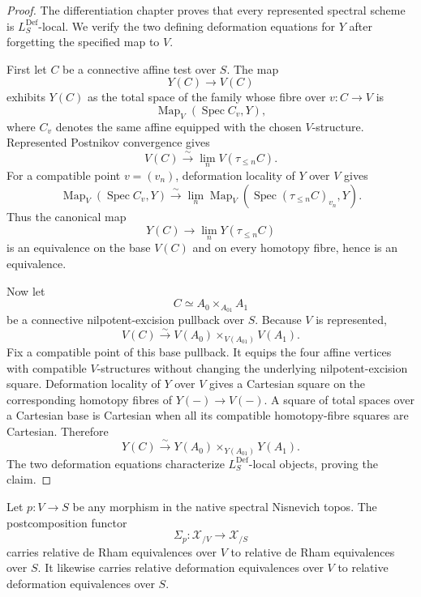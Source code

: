 \begin{proof}
The differentiation chapter proves that every represented spectral scheme is
$L_S^{\mathrm{Def}}$-local.  We verify the two defining deformation equations
for $Y$ after forgetting the specified map to $V$.

First let $C$ be a connective affine test over $S$.  The map
\[
    Y(C)\longrightarrow V(C)
\]
exhibits $Y(C)$ as the total space of the family whose fibre over
$v:C\to V$ is
\[
    \operatorname{Map}_{V}(\operatorname{Spec}C_v,Y),
\]
where $C_v$ denotes the same affine equipped with the chosen $V$-structure.
Represented Postnikov convergence gives
\[
    V(C)\xrightarrow{\sim}\lim_nV(\tau_{\le n}C).
\]
For a compatible point $v=(v_n)$, deformation locality of $Y$ over $V$ gives
\[
    \operatorname{Map}_{V}(\operatorname{Spec}C_v,Y)
    \xrightarrow{\sim}
    \lim_n
    \operatorname{Map}_{V}
    (\operatorname{Spec}(\tau_{\le n}C)_{v_n},Y).
\]
Thus the canonical map
\[
    Y(C)\longrightarrow\lim_nY(\tau_{\le n}C)
\]
is an equivalence on the base $V(C)$ and on every homotopy fibre, hence is an
equivalence.

Now let
\[
    C\simeq A_0\times_{A_{01}}A_1
\]
be a connective nilpotent-excision pullback over $S$.  Because $V$ is
represented,
\[
    V(C)
    \xrightarrow{\sim}
    V(A_0)\times_{V(A_{01})}V(A_1).
\]
Fix a compatible point of this base pullback.  It equips the four affine
vertices with compatible $V$-structures without changing the underlying
nilpotent-excision square.  Deformation locality of $Y$ over $V$ gives a
Cartesian square on the corresponding homotopy fibres of
$Y(-)\to V(-)$.  A square of total spaces over a Cartesian base is Cartesian
when all its compatible homotopy-fibre squares are Cartesian.  Therefore
\[
    Y(C)
    \xrightarrow{\sim}
    Y(A_0)\times_{Y(A_{01})}Y(A_1).
\]
The two deformation equations characterize $L_S^{\mathrm{Def}}$-local
objects, proving the claim.
\end{proof}

\begin{lemma}
\label{lem:bnli-local-equivalence-base-composition}
Let $p:V\to S$ be any morphism in the native spectral Nisnevich topos.  The
postcomposition functor
\[
    \Sigma_p:\mathcal X_{/V}\longrightarrow\mathcal X_{/S}
\]
carries relative de Rham equivalences over $V$ to relative de Rham
equivalences over $S$.  It likewise carries relative deformation equivalences
over $V$ to relative deformation equivalences over $S$.
\end{lemma}

